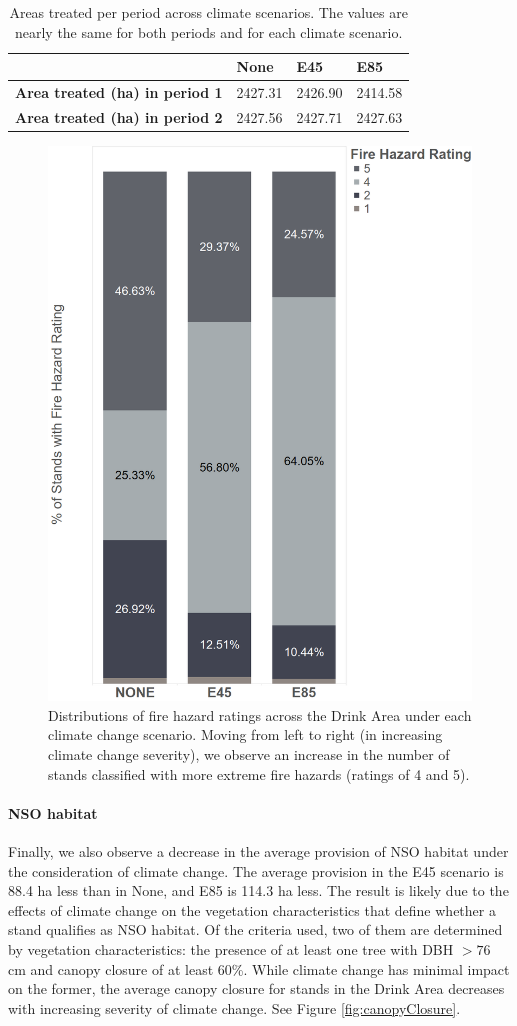 \begin{table}[]
\centering
\caption[Area treated per period across climate scenarios]{Areas treated per period across climate scenarios. The values are nearly the same for both periods and for each climate scenario.}
\label{tab:treatedAreas}
\begin{tabular}{l|lll}
                                                                                                           & \textbf{None} & \textbf{E45} & \textbf{E85} \\ \hline
\textbf{Area treated (ha) in period 1} & 2427.31            & 2426.90 & 2414.58          \\
\textbf{Area treated (ha) in period 2}                     & 2427.56         & 2427.71        & 2427.63      
\end{tabular}
\end{table}

\begin{figure}[ht]
\centering
\includegraphics[width=.5\textwidth]{../images/FireHazardRatingsPerClimateScenario}
\caption[Distribution of fire hazard ratings over the Drink Area for each climate change scenario]{Distributions of fire hazard ratings across the Drink Area under each climate change scenario. Moving from left to right (in increasing climate change severity), we observe an increase in the number of stands classified with more extreme fire hazards (ratings of 4 and 5).}
\label{fig:distOfFireHazards}
\end{figure}

\paragraph{NSO habitat}
Finally, we also observe a decrease in the average provision of NSO habitat under the consideration of climate change. The average provision in the E45 scenario is 88.4 ha less than in None, and E85 is 114.3 ha less. The result is likely due to the effects of climate change on the vegetation characteristics that define whether a stand qualifies as NSO habitat. Of the criteria used, two of them are determined by vegetation characteristics: the presence of at least one tree with DBH $> 76$ cm and canopy closure of at least 60\%. While climate change has minimal impact on the former, the average canopy closure for stands in the Drink Area decreases with increasing severity of climate change. See Figure \ref{fig:canopyClosure}.


